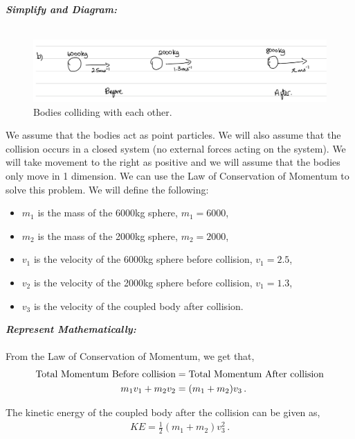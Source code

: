 \begin{subquestions}
\begin{subsubquestions}
\textbf{\textit{Simplify and Diagram:}} \\ \\ 
\begin{figure}[H]
	\begin{center}
		\includegraphics[scale=0.25]{../2008/figures/2008Jq5-1}
		\caption{\label{2008J:q5:Diagram1} Bodies colliding with each other.}
	\end{center}
\end{figure}	
We assume that the bodies act as point particles. We will also assume that the collision occurs in a closed system (no external forces acting on the system). We will take movement to the right as positive and we will assume that the bodies only move in 1 dimension. We can use the Law of Conservation of Momentum to solve this problem.
We will define the following:
\begin{itemize}
	\item $m_1$ is the mass of the 6000kg sphere, $m_1=6000$,
	\item $m_2$ is the mass of the 2000kg sphere, $m_2=2000$,
	\item $v_1$ is the velocity of the 6000kg sphere before collision, $v_1=2.5$,
	\item $v_2$ is the velocity of the 2000kg sphere before collision, $v_1=1.3$,
	\item $v_3$ is the velocity of the coupled body after collision.	
\end{itemize}



\textbf{\textit{Represent Mathematically:}} \\ \\
From the Law of Conservation of Momentum, we get that,
\begin{align}
	\text{Total Momentum Before collision} & = \text{Total Momentum After collision} \nonumber \\
	m_1v_1 + m_2v_2 & = (m_1+m_2)v_3 \,. \label{2008J:q5:VEqn1}
\end{align}

The kinetic energy of the coupled body after the collision can be given as,
\begin{align}
	KE = \frac{1}{2}(m_1+m_2)v_3^2 \,.
\end{align}



\end{subsubquestions}
\end{subquestions}
